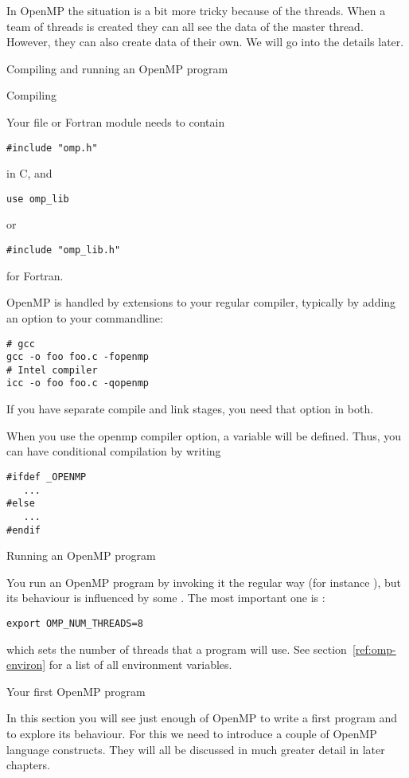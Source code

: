 In OpenMP the situation is a bit more tricky because of the threads.
When a team of threads is created they can all see the data of the
master thread. However, they can also create data of their own.
We will go into the details later.

 {Compiling and running an OpenMP program}

 {Compiling}

Your file or Fortran module needs to contain
\begin{lstlisting}
#include "omp.h"
\end{lstlisting}
in C, and 
\begin{lstlisting}
use omp_lib
\end{lstlisting}
or
\begin{lstlisting}
#include "omp_lib.h"
\end{lstlisting}
for Fortran.

OpenMP is handled by extensions to your regular compiler, typically by
adding an option to your commandline:
\begin{verbatim}
# gcc
gcc -o foo foo.c -fopenmp
# Intel compiler
icc -o foo foo.c -qopenmp
\end{verbatim}
If you have separate compile and link stages, you need that option in both.

When you use the openmp compiler option, a  variable 
will be defined. Thus, you can have conditional compilation by writing
\begin{lstlisting}
#ifdef _OPENMP
   ...
#else
   ...
#endif
\end{lstlisting}


 {Running an OpenMP program}

You run an OpenMP program by invoking it the regular way (for instance ),
but its behaviour is influenced by some .
The most important one is :
\begin{verbatim}
export OMP_NUM_THREADS=8
\end{verbatim}
which sets the number of threads that a program will use.
See section~\ref{ref:omp-environ} for a list of all environment variables.


 {Your first OpenMP program}

In this section you will see just enough of OpenMP to write a first
program and to explore its behaviour. For this we need to introduce a
couple of OpenMP language constructs. They will all be discussed in
much greater detail in later chapters.


